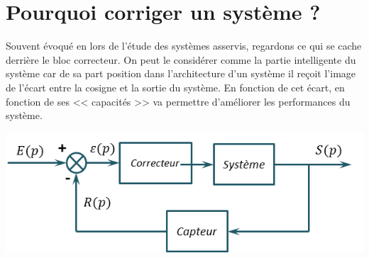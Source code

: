 \documentclass[10pt,fleqn]{article} %
\begin{document}

\setlength{\columnseprule}{.1pt}

\vspace{2cm}
\pagestyle{fancy}
\thispagestyle{plain}
\section{Pourquoi corriger un système ?}

\noindent
\begin{minipage}[c]{.6\linewidth}
\hspace{.4cm} Souvent évoqué en lors de l'étude des systèmes asservis, regardons ce qui se cache derrière le bloc correcteur. On peut le considérer comme la partie intelligente du système car de sa part position dans l'architecture d'un système il reçoit l'image de l'écart entre la cosigne et la sortie du système. En fonction de cet écart, en fonction de ses << capacités >> va permettre d'améliorer les performances du système. 
\end{minipage} \hfill
\begin{minipage}[c]{.35\linewidth}
\begin{center}
\includegraphics[width=\linewidth]{images/fig_01}
\end{center}
\end{minipage} 


\vspace{.25cm}
\end{document}
